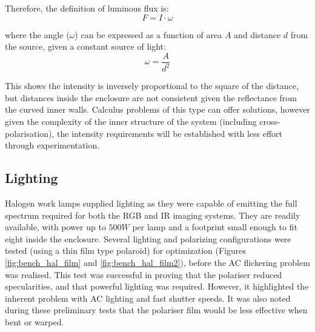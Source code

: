 \documentclass[fleqn,twoside,12pt]{report}
\begin{document}
Therefore, the definition of luminous flux is:
\begin{equation}
	F = I\cdot\omega
\end{equation}

where the angle ($\omega$) can be expressed as a function of area $A$ and distance $d$ from the source, given a constant source of light:
\begin{equation}
	\omega = \frac{A}{d^2}
\end{equation}

This shows the intensity is inversely proportional to the square of the distance, but distances inside the enclosure are not consistent given the reflectance from the curved inner walls. Calculus problems of this type can offer solutions, however given the complexity of the inner structure of the system (including cross-polarisation), the intensity requirements will be established with less effort through experimentation. 




\subsection{Lighting}
\label{sec:lighting}

Halogen work lamps supplied lighting as they were capable of emitting the full spectrum required for both the RGB and IR imaging systems. They are readily available, with power up to $500W$ per lamp and a footprint small enough to fit eight inside the enclosure. Several lighting and polarizing configurations were tested (using a thin film type polaroid) for optimization (Figures \ref{fig:bench_hal_film} and \ref{fig:bench_hal_film2}), before the AC flickering problem was realised. This test was successful in proving that the polariser reduced specularities, and that powerful lighting was required. However, it highlighted the inherent problem with AC lighting and fast shutter speeds. It was also noted during these preliminary tests that the polariser film would be less effective when bent or warped. 
\end{document}

